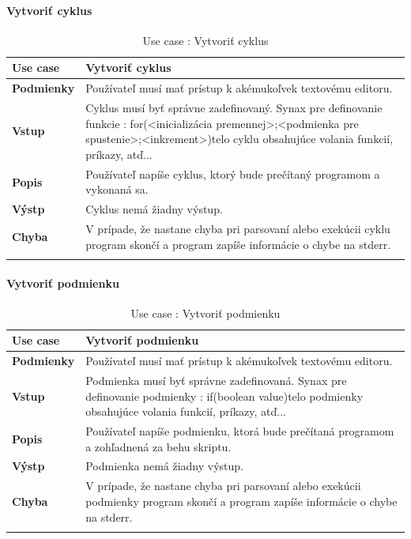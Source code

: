 \paragraph{Vytvoriť cyklus}
\begin{center}
	\begin{longtable}{|p{2.5cm}|p{14cm}|}
		
			\hline
			\textbf{Use case} & Vytvoriť cyklus \\ 
			\hline
			\textbf{Podmienky} & Používateľ musí mať prístup k akémukoľvek textovému editoru.  \\ 
			\hline
			\textbf{Vstup} & Cyklus musí byť správne zadefinovaný. 
			Synax pre definovanie funkcie : 
			\newline
			for(<inicializácia premennej>;<podmienka pre spustenie>;<inkrement>){telo cyklu obsahujúce volania funkcií, príkazy, atď..}. \\
			\hline

			\textbf{Popis} & Používateľ napíše cyklus, ktorý bude prečítaný programom a vykonaná sa.\\ 
			\hline
			\textbf{Výstp} & Cyklus nemá žiadny výstup.\\
			\hline
			\textbf{Chyba} & V prípade, že nastane chyba pri parsovaní alebo exekúcii cyklu program skončí a program zapíše informácie o chybe na stderr.\\
			\hline
		\caption{Use case : Vytvoriť cyklus}
		\label{table:1}
		
	\end{longtable}
\end{center}
\paragraph{Vytvoriť podmienku}
\begin{center}
	\begin{longtable}{|p{2.5cm}|p{14cm}|}
		
			\hline
			\textbf{Use case} & Vytvoriť podmienku \\ 
			\hline
			\textbf{Podmienky} & Používateľ musí mať prístup k akémukoľvek textovému editoru.  \\ 
			\hline
			\textbf{Vstup} & Podmienka musí byť správne zadefinovaná. 
			Synax pre definovanie podmienky : 
			\newline
			if(boolean value){telo podmienky obsahujúce volania funkcií, príkazy, atď..}. \\
			\hline
			\textbf{Popis} & Používateľ napíše podmienku, ktorá bude prečítaná programom a zohľadnená za behu skriptu.\\ 
			\hline
			\textbf{Výstp} & Podmienka nemá žiadny výstup.\\
			\hline
			\textbf{Chyba} & V prípade, že nastane chyba pri parsovaní alebo exekúcii podmienky program skončí a program zapíše informácie o chybe na stderr.\\
			\hline
		\caption{Use case : Vytvoriť podmienku}
		\label{table:1}
		
	\end{longtable}
\end{center}
